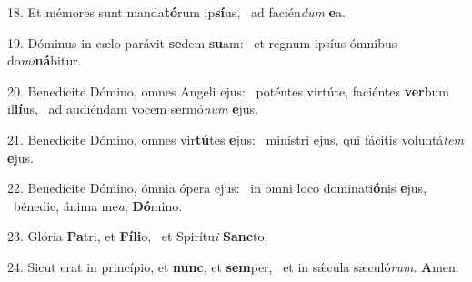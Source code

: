 18. Et mémores sunt manda\textbf{tó}rum ip\textbf{sí}us, \ast\  ad facién\textit{dum} \textbf{e}a.\

19. Dóminus in cælo parávit \textbf{se}dem \textbf{su}am: \ast\  et regnum ipsíus ómnibus do\textit{mi}\textbf{ná}bitur.\

20. Benedícite Dómino, omnes Angeli ejus: \dag\  poténtes virtúte, faciéntes \textbf{ver}bum il\textbf{lí}us, \ast\  ad audiéndam vocem sermó\textit{num} \textbf{e}jus.\

21. Benedícite Dómino, omnes vir\textbf{tú}tes \textbf{e}jus: \ast\  minístri ejus, qui fácitis voluntá\textit{tem} \textbf{e}jus.\

22. Benedícite Dómino, ómnia ópera ejus: \dag\  in omni loco dominati\textbf{ó}nis \textbf{e}jus, \ast\  bénedic, ánima me\textit{a}, \textbf{Dó}mino.\

23. Glória \textbf{Pa}tri, et \textbf{Fí}\textbf{li}o, \ast\  et Spirítu\textit{i} \textbf{Sanc}to.\

24. Sicut erat in princípio, et \textbf{nunc}, et \textbf{sem}per, \ast\  et in sǽcula sæculó\textit{rum}. \textbf{A}men.\

